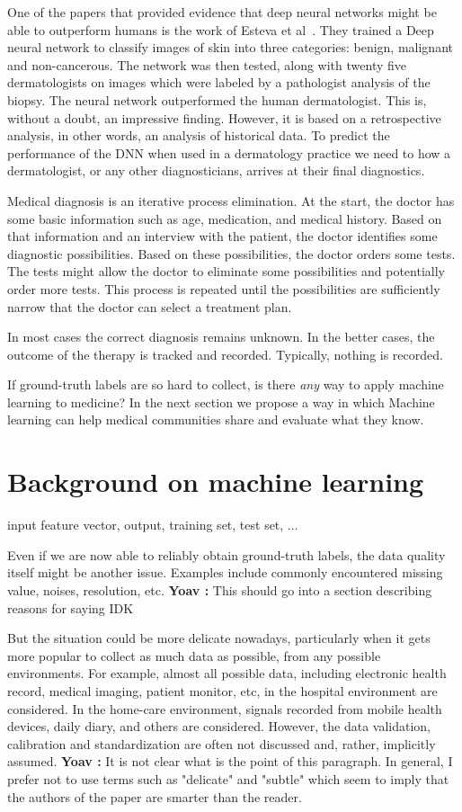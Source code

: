 \documentclass[10pt]{wlscirep}
\newcommand{\comment}[3]{{\color{#1} {\bf #2 :} #3}}
\newcommand{\yoav}[1]{\comment{red}{Yoav}{#1}}
\begin{document}
One of the papers that provided evidence that deep neural networks might be able to outperform humans is the work of Esteva et al~\cite{esteva2017dermatologist}. They trained a Deep neural network to classify images of skin into three categories: benign, malignant and non-cancerous. The network was then tested, along with twenty five dermatologists on images which were labeled by a pathologist analysis of the biopsy. The neural network outperformed the human dermatologist. This is, without a doubt, an impressive finding. However, it is based on a retrospective analysis, in other words, an analysis of historical data. To predict the performance of the DNN when used in a dermatology practice we need to how a dermatologist, or any other diagnosticians, arrives at their final diagnostics.

Medical diagnosis is an iterative process elimination. At the start, the doctor has some basic information such as age, medication, and medical history. Based on that information and an interview with the patient, the doctor identifies some diagnostic possibilities. Based on these possibilities, the doctor orders some tests. The tests might allow the doctor to eliminate some possibilities and potentially order more tests. This process is repeated until the possibilities are sufficiently narrow that the doctor can select a treatment plan. 

In most cases the correct diagnosis remains unknown. In the better cases, the outcome of the therapy is tracked and recorded. Typically, nothing is recorded.

If ground-truth labels are so hard to collect, is there {\em any} way to apply machine learning to medicine?
In the next section we propose a way in which  Machine learning can help medical communities
share and evaluate what they know.

\section{Background on machine learning}
input feature vector, output, training set, test set, ...

Even if we are now able to reliably obtain ground-truth labels, the data quality itself might be another issue. Examples include commonly encountered missing value, noises, resolution, etc. 
\yoav{This should go into a section describing reasons for saying IDK}

But the situation could be more delicate nowadays, particularly when it gets more popular to collect as much data as possible, from any possible environments. For example, almost all possible data, including electronic health record, medical imaging, patient monitor, etc, in the hospital environment are considered. In the home-care environment, signals recorded from mobile health devices, daily diary, and others are considered. However, the data validation, calibration and standardization are often not discussed and, rather, implicitly assumed. 
\yoav{It is not clear what is the point of this paragraph.  In general, I prefer not to use terms such as "delicate" and "subtle" which seem to imply that the authors of the paper are smarter than the reader.}
\end{document}
